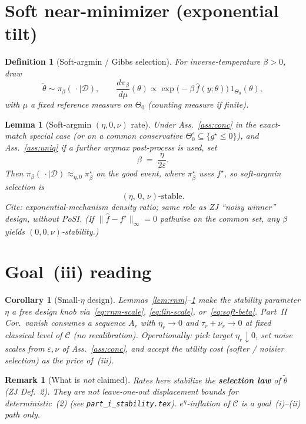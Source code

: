 \documentclass[11pt]{article}
\newtheorem{definition}{Definition}
\newtheorem{lemma}{Lemma}
\newtheorem{corollary}{Corollary}
\newtheorem{remark}{Remark}
\begin{document}
\section{Soft near-minimizer (exponential tilt)}

\begin{definition}[Soft-argmin / Gibbs selection]
\label{def:soft}
For inverse-temperature $\beta>0$, draw
\[
\tilde\theta\sim\pi_\beta(\,\cdot\mid\mathcal{D}),
\qquad
\frac{d\pi_\beta}{d\mu}(\theta)
\propto
\exp\bigl(-\beta\,\hat f(y;\theta)\bigr)\,1_{\Theta_0}(\theta),
\]
with $\mu$ a fixed reference measure on $\Theta_0$ (counting measure if finite).
\end{definition}

\begin{lemma}[Soft-argmin $(\eta,0,\nu)$ rate]
\label{lem:soft}
Under Ass.~\ref{ass:conc} in the exact-match special case
(or on a common conservative $\Theta_0^\varepsilon\subseteq\{g^\star\le 0\}$),
and Ass.~\ref{ass:uniq} if a further argmax post-process is used, set
\begin{equation}
\label{eq:soft-beta}
\beta \;=\; \frac{\eta}{2\varepsilon}.
\end{equation}
Then $\pi_\beta(\,\cdot\mid\mathcal{D})\approx_{\eta,0}\pi_\beta^\star$ on the good event, where $\pi_\beta^\star$ uses $f^\star$,
so soft-argmin selection is
\begin{equation}
\label{eq:soft-rate}
(\eta,\,0,\,\nu)\text{-stable}.
\end{equation}
\textit{Cite:} exponential-mechanism density ratio; same role as ZJ ``noisy winner'' design, without PoSI.
(If $\|\hat f-f^\star\|_\infty=0$ pathwise on the common set, any $\beta$ yields $(0,0,\nu)$-stability.)
\end{lemma}

\section{Goal~(iii) reading}

\begin{corollary}[Small-$\eta$ design]
\label{cor:small-eta}
Lemmas~\ref{lem:rnm}--\ref{lem:soft} make the stability parameter $\eta$ a free design knob
via~\eqref{eq:rnm-scale}, \eqref{eq:lin-scale}, or~\eqref{eq:soft-beta}.
Part~II Cor.~vanish consumes a sequence $A_r$ with $\eta_r\to 0$ and $\tau_r+\nu_r\to 0$
at fixed classical level of $\mathcal{C}$ (no recalibration).
Operationally: pick target $\eta_r\downarrow 0$, set noise scales from $\varepsilon,\nu$ of Ass.~\ref{ass:conc},
and accept the utility cost (softer / noisier selection) as the price of~(iii).
\end{corollary}

\begin{remark}[What is \emph{not} claimed]
Rates here stabilize the \textbf{selection law} of $\tilde\theta$ (ZJ Def.~2).
They are not leave-one-out displacement bounds for deterministic~(2)
(see \texttt{part\_i\_stability.tex}).
$e^\eta$-inflation of $\mathcal{C}$ is a goal~(i)--(ii) path only.
\end{remark}
\end{document}

